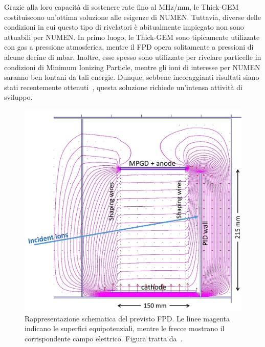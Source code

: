 Grazie alla loro capacità di sostenere rate fino al MHz/mm, le Thick-GEM costituiscono un'ottima soluzione alle esigenze di NUMEN.
Tuttavia, diverse delle condizioni in cui questo tipo di rivelatori è abitualmente impiegato non sono attuabili per NUMEN. 
In primo luogo, le Thick-GEM sono tipicamente utilizzate con gas a pressione atmosferica, mentre il FPD opera solitamente a pressioni di alcune decine di mbar.
Inoltre, esse spesso sono utilizzate per rivelare particelle in condizioni di Minimum Ionizing Particle, mentre gli ioni di interesse per NUMEN saranno ben lontani da tali energie.
Dunque, sebbene incoraggianti risultati siano stati recentemente ottenuti~\cite{cortesi:rsi17}, questa soluzione richiede un'intensa attività di sviluppo.


\begin{figure} [!p]
	\centering
	\includegraphics[scale=0.3]{Grafici/nuovo_fpd.png}
	\caption{Rappresentazione schematica del previsto FPD. Le linee magenta indicano le superfici equipotenziali, mentre le frecce mostrano il corrispondente campo elettrico. Figura tratta da~\cite{cappuzzello:epja18}.} \label{fig:nuovo_fpd}
\end{figure}


